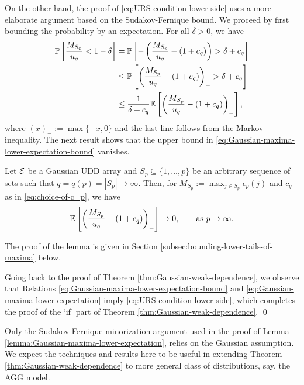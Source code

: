On the other hand, the proof of \eqref{eq:URS-condition-lower-side} uses a more elaborate argument based on the Sudakov-Fernique bound.
We proceed by first bounding the probability by an expectation. 
For all $\delta>0$, we have
\begin{align}
    {\mathbb P}\left[\frac{M_{S_p}}{u_q}<1-\delta\right] 
        &= {\mathbb P}\left[-\left(\frac{M_{S_p}}{u_q} - (1+c_q)\right) > \delta + c_q\right] \nonumber \\
        &\le {\mathbb P}\left[\left(\frac{M_{S_p}}{u_q} - (1+c_q)\right)_->\delta+c_q\right] \nonumber \\
        &\le \frac{1}{\delta + c_q}{\mathbb E}\left[\left(\frac{M_{S_p}}{u_q} - (1+c_q)\right)_-\right], \label{eq:Gaussian-maxima-lower-expectation-bound}
\end{align}
where $(x)_-:=\max\{-x,0\}$ and the last line follows from the Markov inequality.
The next result shows that the upper bound in \eqref{eq:Gaussian-maxima-lower-expectation-bound} vanishes.
\begin{lemma} \label{lemma:Gaussian-maxima-lower-expectation}
  Let ${\cal E}$ be a Gaussian UDD  array  and 
  $S_p\subseteq\{1,\ldots,p\}$ be an arbitrary sequence of sets 
  such that $q = q(p) = |S_p|\to\infty$.  Then, for $M_{S_p}:= \max_{j\in S_p} \epsilon_p(j)$ and $c_q$ as in \eqref{eq:choice-of-c_p}, we have
  \begin{equation} \label{eq:Gaussian-maxima-lower-expectation}
    {\mathbb E}\left[\left(\frac{M_{S_p}}{u_q} - (1+c_q)\right)_-\right] \to 0,\ \ \quad \mbox{ as }p\to \infty.
  \end{equation}
\end{lemma}
The proof of the lemma is given in Section \ref{subsec:bounding-lower-tails-of-maxima} below.


Going back to the proof of Theorem \ref{thm:Gaussian-weak-dependence}, we observe that Relations \eqref{eq:Gaussian-maxima-lower-expectation-bound} and \eqref{eq:Gaussian-maxima-lower-expectation} imply \eqref{eq:URS-condition-lower-side}, which completes the proof of the `if' part of
Theorem \ref{thm:Gaussian-weak-dependence}. \qed 

\begin{remark} Only the Sudakov-Fernique minorization argument used in the proof of Lemma \ref{lemma:Gaussian-maxima-lower-expectation}, relies on the Gaussian assumption. We expect the techniques and results here to be useful in extending Theorem \ref{thm:Gaussian-weak-dependence} to more general class of distributions, say, the AGG model.
\end{remark}


